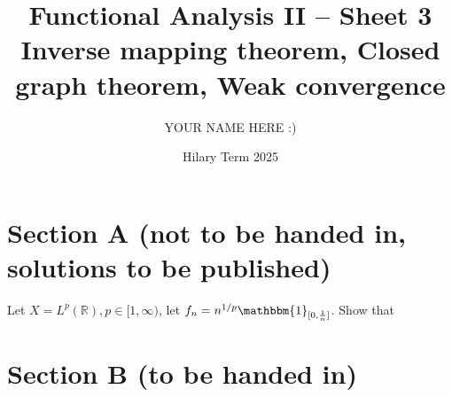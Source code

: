 \documentclass[answers]{exam}
\title{Functional Analysis II -- Sheet 3\\Inverse mapping theorem, Closed graph theorem, Weak convergence}
\author{YOUR NAME HERE :)}
\date{Hilary Term 2025}
\begin{document}
\maketitle

\section*{Section A \large(not to be handed in, solutions to be published)}

\begin{questions}

\question%
Let $X=L^{p}(\mathbb{R}), p \in[1, \infty)$, let $f_{n}=n^{1 / p} \mathbbm{1}_{[0, \frac{1}{n}]}$. Show that

\end{questions}



\section*{Section B \large(to be handed in)}
\end{document}
